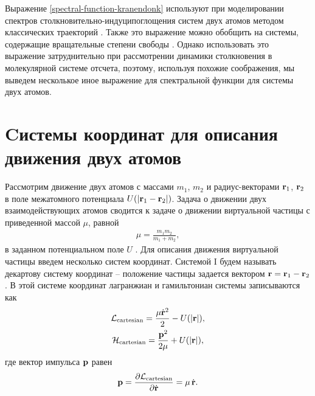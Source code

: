 Выражение \eqref{spectral-function-kranendonk} используют при моделировании спектров столкновительно-индуци поглощения систем двух атомов методом классических траекторий \cite{levine1967, mcquarrie1968, buryak2014}. Также это выражение можно обобщить на системы, содержащие вращательные степени свободы \cite{oparin2017}. Однако использовать это выражение затруднительно при рассмотрении динамики столкновения в молекулярной системе отсчета, поэтому, используя похожие соображения, мы выведем несколькое иное выражение для спектральной функции для системы двух атомов.

\section{Cистемы координат для описания движения двух атомов} \label{section:two-atom-coordinate-systems}

Рассмотрим движение двух атомов с массами $m_1$, $m_2$ и радиус-векторами $\mathbf{r}_1$, $\mathbf{r}_2$ в поле межатомного потенциала $U(\vert \mathbf{r}_1 - \mathbf{r}_2 \vert)$. Задача о движении двух взаимодействующих атомов сводится к задаче о движении виртуальной частицы с приведенной массой $\mu$,  равной 
\begin{gather}
    \mu = \frac{m_1 m_2}{m_1 + m_2}, 
\end{gather}
%
в заданном потенциальном поле $U$ \cite{landau-volume1}. Для описания движения виртуальной частицы введем несколько систем координат. Системой I будем называть декартову систему координат -- положение частицы задается вектором $\mathbf{r} = \mathbf{r}_1 - \mathbf{r}_2$. В этой системе координат лагранжиан и гамильтониан системы записываются как 
\begin{gather}
    \mathcal{L}_\text{cartesian} = \frac{\mu \dot{\mathbf{r}}^2}{2} - U( \vert \mathbf{r} \vert ), \label{two-atom-cartesian-lagrangian} \\
    \mathcal{H}_\text{cartesian} = \frac{\mathbf{p}^2}{2\mu} + U( \vert \mathbf{r} \vert ), \label{two-atom-cartesian-hamiltonian}
\end{gather}
%
где вектор импульса $\mathbf{p}$ равен
\begin{gather}
    \mathbf{p} = \frac{\partial \mathcal{L}_\text{cartesian}}{\partial \dot{\mathbf{r}}} = \mu \, \dot{\mathbf{r}}. \label{two-atom-cartesian-momenta}
\end{gather}

